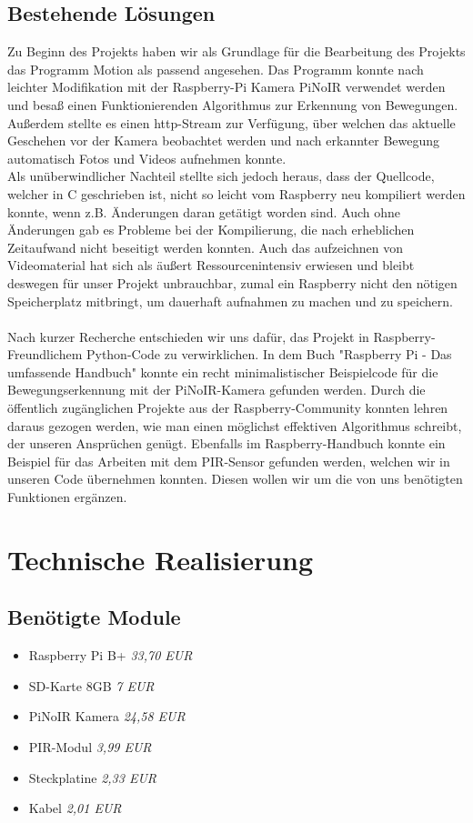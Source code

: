 \documentclass[12pt,a4paper]{scrreprt}
\begin{document}
\section{Bestehende Lösungen} 
Zu Beginn des Projekts haben wir als Grundlage für die Bearbeitung des Projekts das Programm Motion\cite{motion} als passend angesehen. Das Programm konnte nach leichter Modifikation mit der Raspberry-Pi Kamera PiNoIR verwendet werden und besaß einen Funktionierenden Algorithmus zur Erkennung von Bewegungen. Außerdem stellte es einen http-Stream zur Verfügung, über welchen das aktuelle Geschehen vor der Kamera beobachtet werden und nach erkannter Bewegung automatisch Fotos und Videos aufnehmen konnte. 
\\ 
Als unüberwindlicher Nachteil stellte sich jedoch heraus, dass der Quellcode, welcher in C geschrieben ist, nicht so leicht vom Raspberry neu kompiliert werden konnte, wenn z.B. Änderungen daran getätigt worden sind. Auch ohne Änderungen gab es Probleme bei der Kompilierung, die nach erheblichen Zeitaufwand nicht beseitigt werden konnten. Auch das aufzeichnen von Videomaterial hat sich als äußert Ressourcenintensiv erwiesen und bleibt deswegen für unser Projekt unbrauchbar, zumal ein Raspberry nicht den nötigen Speicherplatz mitbringt, um dauerhaft aufnahmen zu machen und zu speichern.
\\ \\
Nach kurzer Recherche entschieden wir uns dafür, das Projekt in Raspberry-Freundlichem Python-Code zu verwirklichen.
In dem Buch "Raspberry Pi - Das umfassende Handbuch" konnte ein recht minimalistischer Beispielcode für die Bewegungserkennung mit der PiNoIR-Kamera gefunden werden\cite[S. XXX]{Raspi}. Durch die öffentlich zugänglichen Projekte aus der Raspberry-Community konnten lehren daraus gezogen werden, wie man einen möglichst effektiven Algorithmus schreibt, der unseren Ansprüchen genügt. Ebenfalls im Raspberry-Handbuch konnte ein Beispiel für das Arbeiten mit dem PIR-Sensor gefunden werden\cite[S. 495]{Raspi}, welchen wir in unseren Code übernehmen konnten.
Diesen wollen wir um die von uns benötigten Funktionen ergänzen.


\chapter{Technische Realisierung}
\section{Benötigte Module}
\begin{itemize}
\item Raspberry Pi B+ \textit{33,70 EUR} 
\item SD-Karte 8GB \textit{7 EUR}
\item PiNoIR Kamera \textit{24,58 EUR}
\item PIR-Modul \textit{3,99 EUR}
\item Steckplatine \textit{2,33 EUR}
\item Kabel \textit{2,01 EUR}
\end{itemize}
\end{document}
